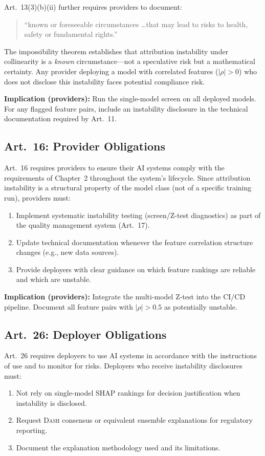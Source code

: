\documentclass{article}
\newcommand{\DASH}{\textsc{Dash}}
\begin{document}
Art.~13(3)(b)(ii) further requires providers to document:
\begin{quote}
``known or foreseeable circumstances \ldots that may lead to risks to health, safety or fundamental rights.''
\end{quote}
The impossibility theorem establishes that attribution instability under collinearity is a \emph{known} circumstance---not a speculative risk but a mathematical certainty. Any provider deploying a model with correlated features ($|\rho| > 0$) who does not disclose this instability faces potential compliance risk.

\textbf{Implication (providers):} Run the single-model screen on all deployed models. For any flagged feature pairs, include an instability disclosure in the technical documentation required by Art.~11.

\subsection*{Art.~16: Provider Obligations}

Art.~16 requires providers to ensure their AI systems comply with the requirements of Chapter~2 throughout the system's lifecycle. Since attribution instability is a structural property of the model class (not of a specific training run), providers must:
\begin{enumerate}
    \item Implement systematic instability testing (screen/Z-test diagnostics) as part of the quality management system (Art.~17).
    \item Update technical documentation whenever the feature correlation structure changes (e.g., new data sources).
    \item Provide deployers with clear guidance on which feature rankings are reliable and which are unstable.
\end{enumerate}

\textbf{Implication (providers):} Integrate the multi-model Z-test into the CI/CD pipeline. Document all feature pairs with $|\rho| > 0.5$ as potentially unstable.

\subsection*{Art.~26: Deployer Obligations}

Art.~26 requires deployers to use AI systems in accordance with the instructions of use and to monitor for risks. Deployers who receive instability disclosures must:
\begin{enumerate}
    \item Not rely on single-model SHAP rankings for decision justification when instability is disclosed.
    \item Request \DASH{} consensus or equivalent ensemble explanations for regulatory reporting.
    \item Document the explanation methodology used and its limitations.
\end{enumerate}
\end{document}
